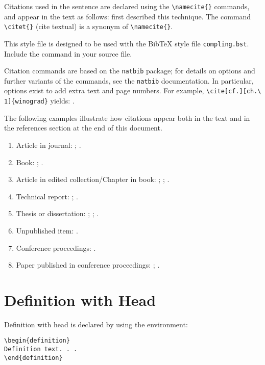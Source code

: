 \documentclass{clv3}
\begin{document}
Citations used in the sentence are declared using the \verb|\namecite{}|
commands, and appear in the text as follows:
 first described this technique.
The command \verb|\citet{}| (cite textual) is a synonym of \verb|\namecite{}|.

This style file is designed to be used with the BibTeX
style file \verb|compling.bst|.  Include the command
\verb|| in your source file.

Citation commands are based on the \verb|natbib| package;
for details on options and further variants of the commands,
see the \verb|natbib| documentation.  In particular, options
exist to add extra text and page numbers.  For example,
\verb|\cite[cf.][ch.\ 1]{winograd}| yields: \cite[cf.][ch.\ 1]{winograd}.

The following examples illustrate how citations appear both in the text
and in the references section at the end of this document.
\begin{enumerate}
\item Article in journal:
 ;
 .
\item Book:
  ;
  .
\item Article in edited collection/Chapter in book:
  ;
  ;
  .
\item Technical report:
  ;
  .
\item Thesis or dissertation:
  ;
  ;
  .
\item Unpublished item:
  .
\item Conference proceedings:
  .
\item Paper published in conference proceedings:
  ;
  .
\end{enumerate}


\section{Definition with Head}

Definition with head is declared by using the environment:
\\
\begin{verbatim}
\begin{definition}
Definition text. . .
\end{definition}
\end{verbatim}
\end{document}
